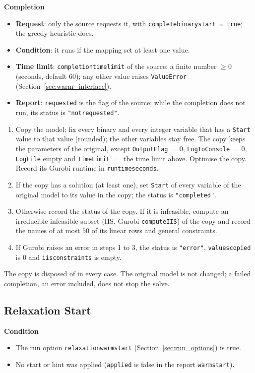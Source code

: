 \documentclass[11pt,a4paper]{article}
\theoremstyle{plain}
\theoremstyle{definition}
\newcommand{\blockhead}[1]{\par\noindent\textbf{#1}\par\nobreak}
\renewcommand{\_}{\textunderscore\allowbreak{}}
\begin{document}
\blockhead{Completion}
\begin{itemize}[nosep,leftmargin=1.5em]
  \item \textbf{Request}: only the source requests it, with \texttt{complete\_binary\_start = true}; the greedy heuristic does.
  \item \textbf{Condition}: it runs if the mapping set at least one value.
  \item \textbf{Time limit}: \texttt{completion\_time\_limit} of the source: a finite number $\ge 0$ (seconds, default $60$); any other value raises \texttt{ValueError} (Section~\ref{sec:warm_interface}).
  \item \textbf{Report}: \texttt{requested} is the flag of the source; while the completion does not run, its status is \texttt{"not\_requested"}.
\end{itemize}
\begin{enumerate}[nosep,label=\arabic*.]
  \item Copy the model; fix every binary and every integer variable that has a \texttt{Start} value to that value (rounded); the other variables stay free. The copy keeps the parameters of the original, except \texttt{OutputFlag} $= 0$, \texttt{LogToConsole} $= 0$, \texttt{LogFile} empty and \texttt{TimeLimit} $=$ the time limit above. Optimise the copy. Record its Gurobi runtime in \texttt{runtime\_seconds}.
  \item If the copy has a solution (at least one), set \texttt{Start} of every variable of the original model to its value in the copy; the status is \texttt{"completed"}.
  \item Otherwise record the status of the copy. If it is infeasible, compute an irreducible infeasible subset (IIS, Gurobi \texttt{computeIIS}) of the copy and record the names of at most $50$ of its linear rows and general constraints.
  \item If Gurobi raises an error in steps 1 to 3, the status is \texttt{"error"}, \texttt{values\_copied} is $0$ and \texttt{iis\_constraints} is empty.
\end{enumerate}
The copy is disposed of in every case. The original model is not changed; a failed completion, an error included, does not stop the solve.

\subsection{Relaxation Start}
\label{sec:warm_relaxation}

\blockhead{Condition}
\begin{itemize}[nosep,leftmargin=1.5em]
  \item The run option \texttt{relaxation\_warm\_start} (Section~\ref{sec:run_options}) is true.
  \item No start or hint was applied (\texttt{applied} is false in the report \texttt{warm\_start}).
\end{itemize}
\end{document}
